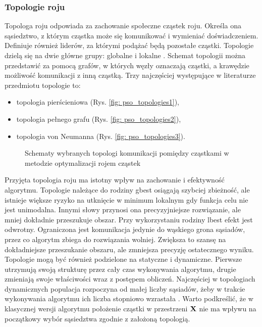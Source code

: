 \subsubsection{Topologie roju}
Topologa roju odpowiada za zachowanie społeczne cząstek roju.  Określa ona sąsiedztwo, z którym cząstka może się komunikować i wymieniać doświadczeniem. Definiuje również liderów, za którymi podążać będą pozostałe cząstki. Topologie dzielą się na dwie główne grupy: globalne  i lokalne . Schemat topologii można przedstawić za pomocą grafów, w których węzły oznaczają cząstki, a krawędzie możliwość komunikacji z inną cząstką. Trzy najczęściej występujące w literaturze przedmiotu topologie to:
\begin{itemize}
	\item topologia pierścieniowa (Rys. \ref{fig: pso_topologies1}),
	\item topologia pełnego grafu (Rys. \ref{fig: pso_topologies2}),
	\item topologia von Neumanna (Rys. \ref{fig: pso_topologies3}).
\end{itemize}
\begin{figure}[hbt!]
	\centering
	\captionsetup{justification=centering}
	\caption{Schematy wybranych topologi komunikacji pomiędzy cząstkami w metodzie optymalizacji rojem cząstek}
	\label{fig: pso_topologies}
\end{figure}
Przyjęta topologia roju ma istotny wpływ na zachowanie i efektywność algorytmu. Topologie należące do rodziny gbest osiągają szybciej zbieżność, ale istnieje większe ryzyko na utknięcie w minimum lokalnym gdy funkcja celu nie jest unimodalna. Innymi słowy przynosi ona precyzyjniejsze rozwiązanie, ale mniej dokładnie przeszukuje obszar. Przy wykorzystaniu rodziny lbest efekt jest odwrotny. Ograniczona jest komunikacja jedynie do wąskiego grona sąsiadów, przez co algorytm zbiega do rozwiązania wolniej. Zwiększa to szansę na dokładniejsze przeszukanie obszaru, ale zmniejsza precyzję ostatecznego wyniku. Topologie mogą być również podzielone na statyczne i dynamiczne. Pierwsze utrzymują swoją strukturę przez cały czas wykonywania algorytmu, drugie zmieniają swoje właściwości wraz z postępem obliczeń. Najczęściej w topologiach dynamicznych populacja rozpoczyna od małej liczby sąsiadów, żeby w trakcie wykonywania algorytmu ich liczba stopniowo wzrastała \parencite{Poli2007}. Warto podkreślić, że w klasycznej wersji algorytmu położenie cząstki w przestrzeni $\mathbf{X}$ nie ma wpływu na początkowy wybór sąsiedztwa zgodnie z założoną topologią.

